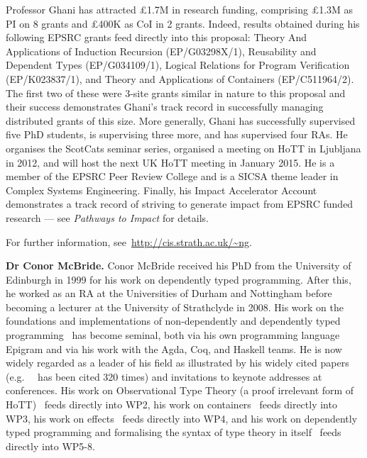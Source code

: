 \documentclass[a4paper,11pt]{article}
\newcommand{\eg}{{e.g.}\ }
\begin{document}
Professor Ghani has attracted \pounds 1.7M in research funding,
comprising \pounds 1.3M as PI on 8 grants and \pounds 400K as CoI in 2
grants.  Indeed, results obtained during his following EPSRC grants
feed directly into this proposal: Theory And Applications of Induction
Recursion (EP/G03298X/1), Reusability and Dependent Types
(EP/G034109/1), Logical Relations for Program Verification
(EP/K023837/1), and Theory and Applications of Containers
(EP/C511964/2). The first two of these were 3-site grants similar in
nature to this proposal and their success demonstrates Ghani's track
record in successfully managing distributed grants of this size. More
generally, Ghani has successfully supervised five PhD students, is
supervising three more, and has supervised four RAs. He organises the
ScotCats seminar series, organised a meeting on HoTT in Ljubljana in
2012, and will host the next UK HoTT meeting in January 2015. He is a
member of the EPSRC Peer Review College and is a SICSA theme leader in
Complex Systems Engineering. Finally, his Impact Accelerator Account
demonstrates a track record of striving to generate impact from EPSRC
funded research --- see {\em Pathways to Impact} for details.

For further information, see~\url{http://cis.strath.ac.uk/~ng}.

\textbf{Dr Conor McBride.} Conor McBride received his PhD from the
University of Edinburgh in 1999 for his work on dependently typed
programming. After this, he worked as an RA at the Universities of
Durham and Nottingham before becoming a lecturer at the University of
Strathclyde in 2008. His work on the foundations and implementations
of non-dependently and dependently typed
programming~\cite{viewftl,alti:ott-conf,easy,mcbride:outrageous} has
become seminal, both via his own programming language Epigram and via
his work with the Agda, Coq, and Haskell teams. He is now widely
regarded as a leader of his field as illustrated by his widely cited
papers (\eg ~\cite{viewftl} has been cited 320 times) and invitations
to keynote addresses at conferences. His work on Observational Type
Theory (a proof irrelevant form of HoTT)~\cite{alti:ott-conf} feeds directly
into WP2, his work on containers~\cite{alti:mpc04} feeds directly into WP3, his
work on effects~\cite{conor:frank} feeds directly into WP4, and his work on
dependently typed programming and formalising the syntax of type
theory in itself~\cite{viewftl,alti:ott-conf,easy,mcbride:outrageous}
feeds directly into WP5-8.
\end{document}

